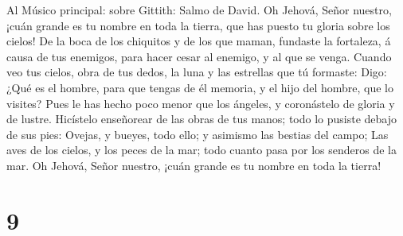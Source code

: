  Al Músico principal: sobre Gittith: Salmo de David. Oh
Jehová, Señor nuestro, ¡cuán grande es tu nombre en toda la tierra, que
has puesto tu gloria sobre los cielos!  De la boca de los
chiquitos y de los que maman, fundaste la fortaleza, á causa de tus
enemigos, para hacer cesar al enemigo, y al que se venga. 
Cuando veo tus cielos, obra de tus dedos, la luna y las estrellas que tú
formaste:  Digo: ¿Qué es el hombre, para que tengas de él
memoria, y el hijo del hombre, que lo visites?  Pues le
has hecho poco menor que los ángeles, y coronástelo de gloria y de
lustre.  Hicístelo enseñorear de las obras de tus manos;
todo lo pusiste debajo de sus pies:  Ovejas, y bueyes,
todo ello; y asimismo las bestias del campo;  Las aves de
los cielos, y los peces de la mar; todo cuanto pasa por los senderos de
la mar.  Oh Jehová, Señor nuestro, ¡cuán grande es tu
nombre en toda la tierra!

\hypertarget{section-8}{%
\section{9}\label{section-8}}

